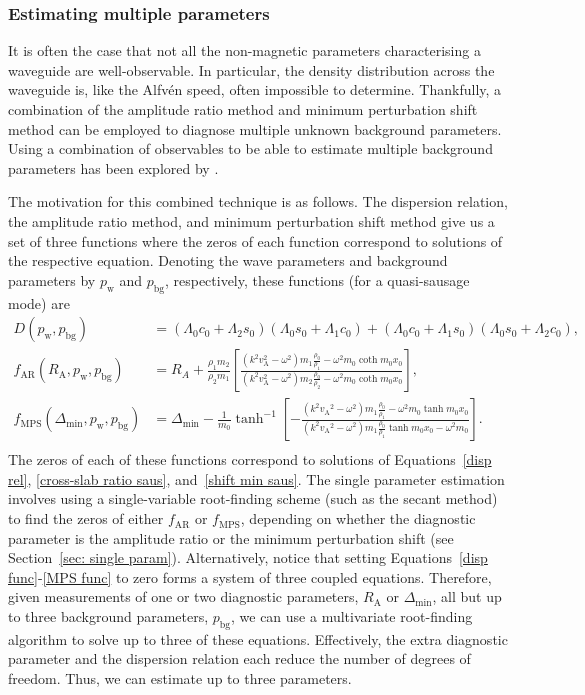 \documentclass[12pt]{../style-files/ociamthesis}
\begin{document}
\subsubsection{Estimating multiple parameters} \label{sec: multiple params}

It is often the case that not all the non-magnetic parameters characterising a waveguide are well-observable. In particular, the density distribution across the waveguide is, like the Alfv\'{e}n speed, often impossible to determine. Thankfully, a combination of the amplitude ratio method and minimum perturbation shift method can be employed to diagnose multiple unknown background parameters. Using a combination of observables to be able to estimate multiple background parameters has been explored by \cite{arr_etal07,Goo_etal08}.

The motivation for this combined technique is as follows. The dispersion relation, the amplitude ratio method, and minimum perturbation shift method give us a set of three functions where the zeros of each function correspond to solutions of the respective equation. Denoting the wave parameters and background parameters by $p_\mathrm{w}$ and $p_\mathrm{bg}$, respectively, these functions (for a quasi-sausage mode) are
\begin{align}
D(p_\mathrm{w}, p_\mathrm{bg}) &= (\Lambda_0c_0 + \Lambda_2s_0)(\Lambda_0s_0 + \Lambda_1c_0) + (\Lambda_0c_0 + \Lambda_1s_0)(\Lambda_0s_0 + \Lambda_2c_0), \label{disp func} \\
f_{\mathrm{AR}}(R_\mathrm{A}, p_\mathrm{w}, p_\mathrm{bg}) &= R_A + \frac{\rho_1m_2}{\rho_2m_1}\left[\frac{(k^2v_\textrm{A}^2 - \omega^2)m_1\frac{\rho_0}{\rho_1} - \omega^2m_0\coth{m_0x_0}}{(k^2v_\textrm{A}^2 - \omega^2)m_2\frac{\rho_0}{\rho_2} - \omega^2m_0\coth{m_0x_0}}\right], \label{AR func} \\
f_{\mathrm{MPS}}(\Delta_\mathrm{min}, p_\mathrm{w}, p_\mathrm{bg}) &= \Delta_\textrm{min} - \frac{1}{m_0}\tanh^{-1}\left[-\frac{(k^2{v_\textrm{A}}^2 - \omega^2)m_1\frac{\rho_0}{\rho_1} - \omega^2{m_0}\tanh{m_0x_0}}{(k^2{v_\textrm{A}}^2 - \omega^2)m_1\frac{\rho_0}{\rho_1}\tanh{m_0x_0} - \omega^2{m_0}}\right]. \label{MPS func} \\
\end{align}
The zeros of each of these functions correspond to solutions of Equations~\eqref{disp rel}, \eqref{cross-slab ratio saus}, and~\eqref{shift min saus}. The single parameter estimation involves using a single-variable root-finding scheme (such as the secant method) to find the zeros of either $f_\mathrm{AR}$ or $f_\mathrm{MPS}$, depending on whether the diagnostic parameter is the amplitude ratio or the minimum perturbation shift (see Section~\ref{sec: single param}). Alternatively, notice that setting Equations~\eqref{disp func}-\eqref{MPS func} to zero forms a system of three coupled equations. Therefore, given measurements of one or two diagnostic parameters, $R_\mathrm{A}$ or $\Delta_\mathrm{min}$, all but up to three background parameters, $p_\mathrm{bg}$, we can use a multivariate root-finding algorithm to solve up to three of these equations. Effectively, the extra diagnostic parameter and the dispersion relation each reduce the number of degrees of freedom. Thus, we can estimate up to three parameters.
\end{document}
